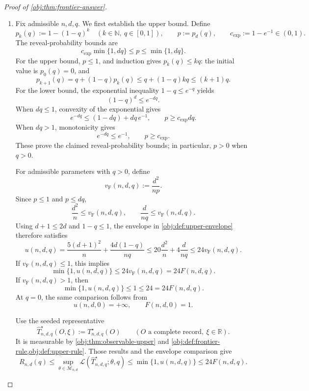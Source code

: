 \documentclass[11pt]{article}
\begin{document}
\begin{proof}[Proof of \cref{obj:thm:frontier-answer}]
\begin{enumerate}
\item Fix admissible \(n,d,q\). We first establish the upper bound. Define
\[
p_k(q):=1-(1-q)^k
\quad(k\in\mathbb N,\ q\in[0,1]),
\qquad
p:=p_d(q),
\qquad
c_{\mathrm{exp}}:=1-e^{-1}\in(0,1).
\]
The reveal-probability bounds are
\[
c_{\mathrm{exp}}\min\{1,dq\}\le p\le\min\{1,dq\}.
\]
For the upper bound, \(p\le1\), and induction gives \(p_k(q)\le kq\): the initial value is \(p_0(q)=0\), and
\[
p_{k+1}(q)
=q+(1-q)p_k(q)
\le q+(1-q)kq
\le(k+1)q.
\]
For the lower bound, the exponential inequality \(1-q\le e^{-q}\) yields
\[
(1-q)^d\le e^{-dq}.
\]
When \(dq\le1\), convexity of the exponential gives
\[
e^{-dq}\le(1-dq)+dq\,e^{-1},
\qquad
p\ge c_{\mathrm{exp}}dq.
\]
When \(dq>1\), monotonicity gives
\[
e^{-dq}\le e^{-1},
\qquad
p\ge c_{\mathrm{exp}}.
\]
These prove the claimed reveal-probability bounds; in particular, \(p>0\) when \(q>0\).

For admissible parameters with \(q>0\), define
\[
v_{\mathrm{F}}(n,d,q):=\frac{d^2}{np}.
\]
Since \(p\le1\) and \(p\le dq\),
\[
\frac{d^2}{n}\le v_{\mathrm{F}}(n,d,q),
\qquad
\frac{d}{nq}\le v_{\mathrm{F}}(n,d,q).
\]
Using \(d+1\le2d\) and \(1-q\le1\), the envelope in
\cref{obj:def:upper-envelope} therefore satisfies
\[
u(n,d,q)
=\frac{5(d+1)^2}{n}+\frac{4d(1-q)}{nq}
\le20\frac{d^2}{n}+4\frac{d}{nq}
\le24v_{\mathrm{F}}(n,d,q).
\]
If \(v_{\mathrm{F}}(n,d,q)\le1\), this implies
\[
\min\{1,u(n,d,q)\}\le24v_{\mathrm{F}}(n,d,q)=24F(n,d,q).
\]
If \(v_{\mathrm{F}}(n,d,q)>1\), then
\[
\min\{1,u(n,d,q)\}\le1\le24=24F(n,d,q).
\]
At \(q=0\), the same comparison follows from
\[
u(n,d,0)=+\infty,
\qquad
F(n,d,0)=1.
\]

Use the seeded representative
\[
\widehat T^\star_{n,d,q}(O,\xi):=T^\star_{n,d,q}(O)
\qquad
(O\text{ a complete record},\ \xi\in\mathbb R).
\]
It is measurable by \cref{obj:thm:observable-upper} and
\cref{obj:def:frontier-rule,obj:def:upper-rule}. Those results and the envelope comparison give
\[
R_{n,d}(q)
\le
\sup_{\theta\in\mathcal M_{n,d}}
\mathcal L(\widehat T^\star_{n,d,q};\theta,q)
\le
\min\{1,u(n,d,q)\}
\le24F(n,d,q).
\]


\end{enumerate}
\end{proof}
\end{document}
